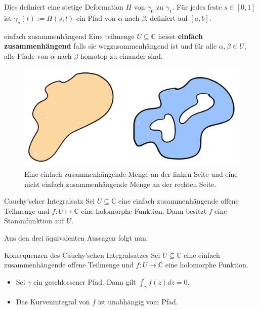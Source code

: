 \documentclass[a4paper,10pt]{article}
\def\C{\mathbb{C}}
\begin{document}
Dies definiert eine stetige Deformation $H$ von $\gamma_0$ zu $\gamma_1$. Für jedes feste $s \in [0,1]$ ist $\gamma_s(t) := H(s, t)$ ein Pfad von $\alpha$ nach $\beta$, definiert auf $[a,b]$.

\begin{subbox}{einfach zusammenhängend}
  Eine teilmenge $U \subseteq \C$ heisst \textbf{einfach zusammenhängend} falls sie wegzusammenhängend ist und für alle $\alpha, \beta \in U$, alle Pfade von $\alpha$ nach $\beta$ homotop zu einander sind.
\end{subbox}

\begin{figure}[H]
  \centering 
  \includegraphics[width=0.9\linewidth]{assets/connected.png}
  \caption{Eine einfach zusammenhängende Menge an der linken Seite und eine nicht einfach zusammenhängende Menge an der rechten Seite.}
\end{figure}

\begin{mainbox}{Cauchy'scher Integralsatz}
  Sei $U \subseteq \C$ eine einfach zusammenhängende offene Teilmenge und $f: U \mapsto \C$ eine holomorphe Funktion. Dann besitzt $f$ eine Stammfunktion auf $U$.
\end{mainbox}

Aus den drei äquivalenten Aussagen folgt nun:

\begin{subbox}{Konsequenzen des Cauchy'schen Integralsatzes}
  Sei $U \subseteq \C$ eine einfach zusammenhängende offene Teilmenge und $f: U \mapsto \C$ eine holomorphe Funktion.
  \begin{itemize}
    \item Sei $\gamma$ ein geschlossener Pfad. Dann gilt $\int_\gamma f(z) dz = 0$.
    \item Das Kurvenintegral von $f$ ist unabhängig vom Pfad.
  \end{itemize}
\end{subbox}
\end{document}
